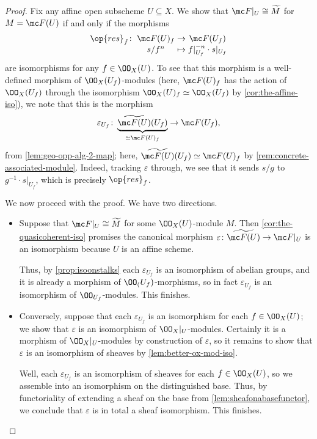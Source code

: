\documentclass[../notes.tex]{subfiles}
\begin{document}
\begin{proof}
	Fix any affine open subscheme $U\subseteq X$. We show that $\mc F|_U\cong\widetilde M$ for $M=\mc F(U)$ if and only if the morphisms
	\[\arraycolsep=1.4pt\begin{array}{cccc}
		\op{res}_f\colon& \mc F(U)_f &\to& \mc F(U_f) \\
		& s/f^n &\mapsto& f|_{U_f}^{-n}\cdot s|_{U_f}
	\end{array}\]
	are isomorphisms for any $f\in\OO_X(U)$. To see that this morphism is a well-defined morphism of $\OO_X(U_f)$-modules (here, $\mc F(U)_f$ has the action of $\OO_X(U_f)$ through the isomorphism $\OO_X(U)_f\simeq\OO_X(U_f)$ by \autoref{cor:the-affine-iso}), we note that this is the morphism
	\[\varepsilon_{U_f}\colon\underbrace{\widetilde{\mc F(U)}(U_f)}_{\simeq\mc F(U)_f}\to\mc F(U_f),\]
	from \autoref{lem:geo-opp-alg-2-map}; here, $\widetilde{\mc F(U)}(U_f)\simeq\mc F(U)_f$ by \autoref{rem:concrete-associated-module}. Indeed, tracking $\varepsilon$ through, we see that it sends $s/g$ to $g^{-1}\cdot s|_{U_f}$, which is precisely $\op{res}_f$.
	
	We now proceed with the proof. We have two directions.
	\begin{itemize}
		\item Suppose that $\mc F|_U\cong\widetilde M$ for some $\OO_X(U)$-module $M$. Then \autoref{cor:the-quasicoherent-iso} promises the canonical morphism $\varepsilon\colon\widetilde{\mc F(U)}\to\mc F|_U$ is an isomorphism because $U$ is an affine scheme.
		
		Thus, by \autoref{prop:isoonstalks} each $\varepsilon_{U_f}$ is an isomorphism of abelian groups, and it is already a morphism of $\OO_(U_f)$-morphisms, so in fact $\varepsilon_{U_f}$ is an isomorphism of $\OO_{U_f}$-modules. This finishes.

		\item Conversely, suppose that each $\varepsilon_{U_f}$ is an isomorphism for each $f\in\OO_X(U)$; we show that $\varepsilon$ is an isomorphism of $\OO_X|_U$-modules. Certainly it is a morphism of $\OO_X|_U$-modules by construction of $\varepsilon$, so it remains to show that $\varepsilon$ is an isomorphism of sheaves by \autoref{lem:better-ox-mod-iso}.

		Well, each $\varepsilon_{U_f}$ is an isomorphism of sheaves for each $f\in\OO_X(U)$, so we assemble into an isomorphism on the distinguished base. Thus, by functoriality of extending a sheaf on the base from \autoref{lem:sheafonabasefunctor}, we conclude that $\varepsilon$ is in total a sheaf isomorphism. This finishes.
		\qedhere
	\end{itemize}
\end{proof}
\end{document}
